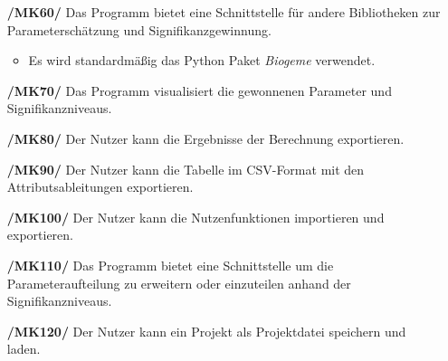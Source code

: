 \documentclass{article}
\begin{document}
\begin{itemize}
    \item[\textbf{/MK60/}] Das Programm bietet eine Schnittstelle für andere Bibliotheken zur Parameterschätzung und Signifikanzgewinnung. 
    \begin{itemize}
        \item Es wird standardmäßig das Python Paket \emph{Biogeme} verwendet.
    \end{itemize}
    \item[\textbf{/MK70/}] Das Programm visualisiert die gewonnenen Parameter und Signifikanzniveaus.
    \item[\textbf{/MK80/}] Der Nutzer kann die Ergebnisse der Berechnung  exportieren.
    \item[\textbf{/MK90/}] Der Nutzer kann die Tabelle im CSV-Format mit den Attributsableitungen exportieren.
    \item[\textbf{/MK100/}] Der Nutzer kann die Nutzenfunktionen importieren und exportieren.
    \item[\textbf{/MK110/}] Das Programm bietet eine Schnittstelle um die Parameteraufteilung zu erweitern oder einzuteilen anhand der Signifikanzniveaus.
    \item[\textbf{/MK120/}] Der Nutzer kann ein Projekt als Projektdatei speichern und laden.
\end{itemize}
\end{document}

